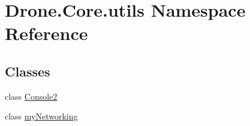 \hypertarget{namespace_drone_1_1_core_1_1utils}{}\section{Drone.\+Core.\+utils Namespace Reference}
\label{namespace_drone_1_1_core_1_1utils}
\subsection*{Classes}
\begin{DoxyCompactItemize}
\item 
class \hyperlink{class_drone_1_1_core_1_1utils_1_1_console2}{Console2}
\item 
class \hyperlink{class_drone_1_1_core_1_1utils_1_1my_networking}{my\+Networking}
\end{DoxyCompactItemize}
